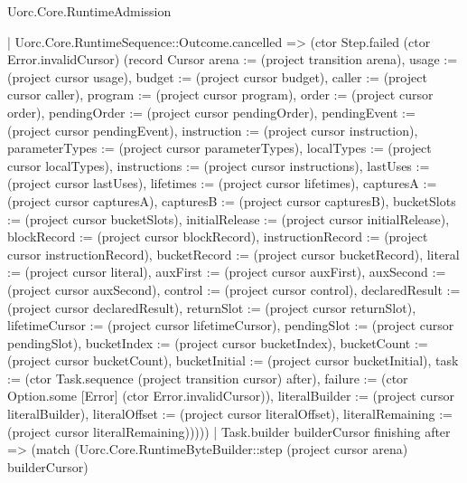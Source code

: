 \begin{lexlean}{Uorc.Core.RuntimeAdmission}
\begin{semanticmodule}
{        | Uorc.Core.RuntimeSequence::Outcome.cancelled => (ctor Step.failed (ctor Error.invalidCursor) (record Cursor {arena := (project transition arena), usage := (project cursor usage), budget := (project cursor budget), caller := (project cursor caller), program := (project cursor program), order := (project cursor order), pendingOrder := (project cursor pendingOrder), pendingEvent := (project cursor pendingEvent), instruction := (project cursor instruction), parameterTypes := (project cursor parameterTypes), localTypes := (project cursor localTypes), instructions := (project cursor instructions), lastUses := (project cursor lastUses), lifetimes := (project cursor lifetimes), capturesA := (project cursor capturesA), capturesB := (project cursor capturesB), bucketSlots := (project cursor bucketSlots), initialRelease := (project cursor initialRelease), blockRecord := (project cursor blockRecord), instructionRecord := (project cursor instructionRecord), bucketRecord := (project cursor bucketRecord), literal := (project cursor literal), auxFirst := (project cursor auxFirst), auxSecond := (project cursor auxSecond), control := (project cursor control), declaredResult := (project cursor declaredResult), returnSlot := (project cursor returnSlot), lifetimeCursor := (project cursor lifetimeCursor), pendingSlot := (project cursor pendingSlot), bucketIndex := (project cursor bucketIndex), bucketCount := (project cursor bucketCount), bucketInitial := (project cursor bucketInitial), task := (ctor Task.sequence (project transition cursor) after), failure := (ctor Option.some [Error] (ctor Error.invalidCursor)), literalBuilder := (project cursor literalBuilder), literalOffset := (project cursor literalOffset), literalRemaining := (project cursor literalRemaining)}))))
    | Task.builder builderCursor finishing after => (match (Uorc.Core.RuntimeByteBuilder::step (project cursor arena) builderCursor)
}
\end{semanticmodule}
\end{lexlean}
